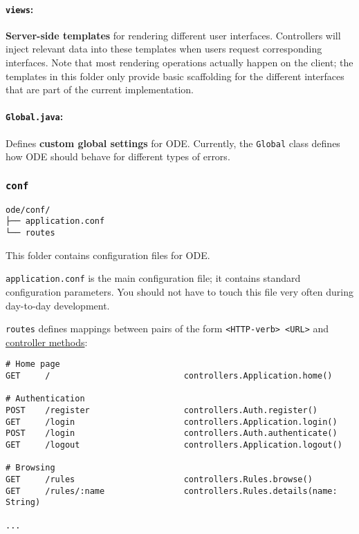 \documentclass[11pt]{article}
\begin{document}
\paragraph{\texttt{views}:}
\label{sec-3-3-1-7}
\textbf{Server-side templates} for rendering different user interfaces.
Controllers will inject relevant data into these templates when
users request corresponding interfaces. Note that most rendering
operations actually happen on the client; the templates in this
folder only provide basic scaffolding for the different
interfaces that are part of the current implementation.

\paragraph{\texttt{Global.java}:}
\label{sec-3-3-1-8}
Defines \textbf{custom global settings} for ODE. Currently, the \texttt{Global}
class defines how ODE should behave for different types of
errors.

\subsubsection{\texttt{conf}}
\label{sec-3-3-2}
\begin{verbatim}
ode/conf/
├── application.conf
└── routes
\end{verbatim}

This folder contains configuration files for ODE.

\texttt{application.conf} is the main configuration file; it contains
standard configuration parameters. You should not have to touch
this file very often during day-to-day development.

\texttt{routes} defines mappings between pairs of the form \texttt{<HTTP-verb>
    <URL>} and \hyperref[sec-3-3-1-2]{controller methods}:

\begin{verbatim}
# Home page
GET     /                           controllers.Application.home()

# Authentication
POST    /register                   controllers.Auth.register()
GET     /login                      controllers.Application.login()
POST    /login                      controllers.Auth.authenticate()
GET     /logout                     controllers.Application.logout()

# Browsing
GET     /rules                      controllers.Rules.browse()
GET     /rules/:name                controllers.Rules.details(name: String)

...
\end{verbatim}
\end{document}
